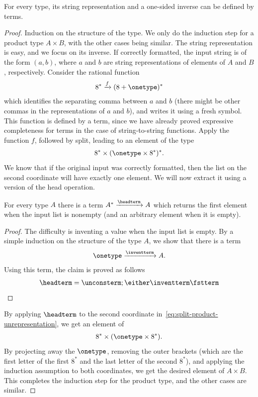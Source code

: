 \begin{lemma}\label{lem:terms-define-string-representation}
    For every type, its string representation and a one-sided inverse  can be defined by terms.
\end{lemma}
\begin{proof}
    Induction on the structure of the type. We only do the induction step for a product type $A \times B$, with the other cases being similar. The string representation is easy, and we focus on its inverse. If correctly formatted, the input string is of the form $(a,b)$, where $a$ and $b$ are string representations of elements of $A$ and $B$, respectively. Consider the rational function 
    \begin{align*}
    8^* \xrightarrow f (8 + \onetype)^*
    \end{align*}
    which identifies the separating comma between $a$ and $b$ (there might be other commas in the representations of $a$ and $b$), and writes it using a fresh symbol. This function is defined by a term, since we have already proved expressive completeness for terms in the case of string-to-string functions. Apply the function $f$, followed by split, leading to an element of the type
\begin{align}\label{eq:split-product-unrepresentation}
    8^* \times (\onetype \times 8^*)^*.
\end{align}
We know that if the original input was correctly formatted, then the list on the second coordinate will have exactly one element. We will now extract it using a version of the head operation.
\begin{claim}
    \label{claim:head}
    For every type $A$ there is a term  $A^* \xrightarrow \headterm A$ which returns the first element when the input list is nonempty (and an arbitrary element when it is empty). 
\end{claim}
\begin{proof}
    The difficulty is inventing a value when the input list is empty. By a simple induction on the structure of the type $A$, we show that there is a term
    \begin{align*}
    \onetype \xrightarrow{\inventterm} A.
    \end{align*}
    Using this term, the claim is proved as follows
    \begin{align*}
   \headterm =  \unconsterm; \either  \inventterm \fstterm
    \end{align*}
\end{proof}
By applying $\headterm$  to the second coordinate in~\eqref{eq:split-product-unrepresentation}, we get an element of 
\begin{align*}
8^* \times (\onetype \times 8^*).
\end{align*}
By projecting away the $\onetype$, removing the outer brackets (which are the first letter of the first $8^*$ and the last letter of the second $8^*$), and applying the induction assumption to both coordinates, we get the desired element of $A \times B$. This completes the induction step for the product type, and the other cases are similar.
\end{proof}


